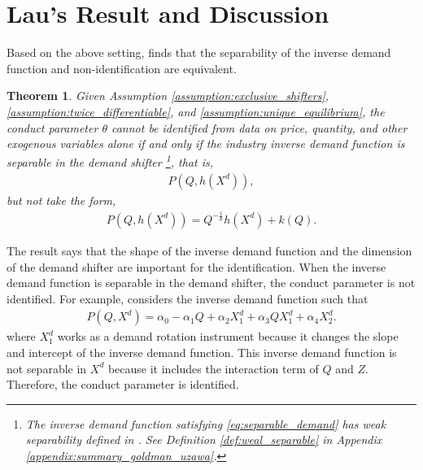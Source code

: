 \documentclass[11pt, a4paper]{article}
\newtheorem{theorem}{Theorem}
\theoremstyle{remark}
\begin{document}
\section{Lau's Result and Discussion}\label{sec:lau_result}
Based on the above setting, \citet{lau1982identifying} finds that the separability of the inverse demand function and non-identification are equivalent.
\begin{theorem}\label{theorem_lau}
    Given Assumption \ref{assumption:exclusive_shifters}, \ref{assumption:twice_differentiable}, and \ref{assumption:unique_equilibrium},
    the conduct parameter $\theta$ cannot be identified from data on price, quantity, and other exogenous variables alone if and only if the industry inverse demand function is separable in the demand shifter \footnote{The inverse demand function satisfying \eqref{eq:separable_demand} has weak separability defined in \citet{goldmanNote1964}. See Definition \ref{def:weal_separable} in Appendix \ref{appendix:summary_goldman_uzawa}.}, that is,
    \begin{align}
        P(Q, h(X^{d})), \label{eq:separable_demand}
    \end{align}
    but not take the form, 
    \begin{align}
        P(Q, h(X^{d})) = Q^{-\frac{1}{\theta}}h(X^{d}) + k(Q). \label{eq:identification_separable_demand_lau}
    \end{align}
\end{theorem}
The result says that the shape of the inverse demand function and the dimension of the demand shifter are important for the identification.
When the inverse demand function is separable in the demand shifter, the conduct parameter is not identified.
For example, \citet{bresnahan1982oligopoly} considers the inverse demand function such that 
\begin{align}
    P(Q, X^{d}) = \alpha_0 - \alpha_1Q + \alpha_2X^{d}_1 + \alpha_3QX^{d}_1 + \alpha_4X^{d}_2. \label{eq:demand_bresnahan}
\end{align}
where $X^{d}_1$ works as a demand rotation instrument because it changes the slope and intercept of the inverse demand function.
This inverse demand function is not separable in $X^{d}$ because it includes the interaction term of $Q$ and $Z$.
Therefore, the conduct parameter is identified.
\end{document}
